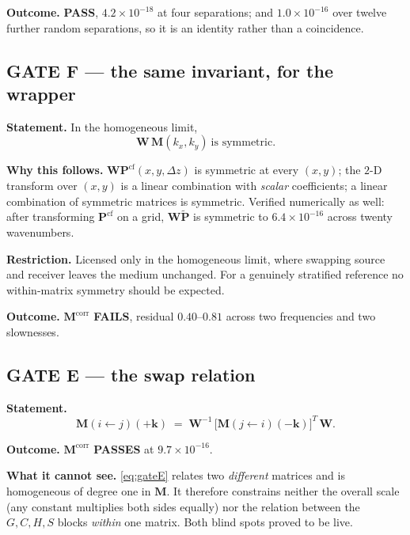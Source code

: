 \documentclass[11pt,a4paper]{article}
\newcommand{\bW}{\mathbf{W}}
\newcommand{\bM}{\mathbf{M}}
\newcommand{\bP}{\mathbf{P}}
\begin{document}
\textbf{Outcome.}  \textbf{PASS}, $4.2\times10^{-18}$ at four separations;
and $1.0\times10^{-16}$ over twelve further random separations, so it is an
identity rather than a coincidence.

\subsection{GATE F --- the same invariant, for the wrapper}

\textbf{Statement.}  In the homogeneous limit,
\begin{equation}\label{eq:gateF}
  \bW\,\bM(k_x,k_y) \ \text{is symmetric.}
\end{equation}

\textbf{Why this follows.}  $\bW\bP^{\text{cf}}(x,y,\Delta z)$ is symmetric at
every $(x,y)$; the $2$-D transform over $(x,y)$ is a linear combination with
\emph{scalar} coefficients; a linear combination of symmetric matrices is
symmetric.  Verified numerically as well: after transforming
$\bP^{\text{cf}}$ on a grid, $\bW\tilde{\bP}$ is symmetric to
$6.4\times10^{-16}$ across twenty wavenumbers.

\textbf{Restriction.}  Licensed only in the homogeneous limit, where swapping
source and receiver leaves the medium unchanged.  For a genuinely stratified
reference no within-matrix symmetry should be expected.

\textbf{Outcome.}  $\bM^{\text{corr}}$ \textbf{FAILS}, residual $0.40$--$0.81$
across two frequencies and two slownesses.

\subsection{GATE E --- the swap relation}\label{sec:gateE}

\textbf{Statement.}
\begin{equation}\label{eq:gateE}
  \bM(i\!\leftarrow\! j)(+\mathbf{k})
  \;=\; \bW^{-1}\,\bigl[\bM(j\!\leftarrow\! i)(-\mathbf{k})\bigr]^{T}\,\bW .
\end{equation}

\textbf{Outcome.}  $\bM^{\text{corr}}$ \textbf{PASSES} at
$9.7\times10^{-16}$.

\textbf{What it cannot see.}  \eqref{eq:gateE} relates two \emph{different}
matrices and is homogeneous of degree one in $\bM$.  It therefore constrains
neither the overall scale (any constant multiplies both sides equally) nor the
relation between the $G,C,H,S$ blocks \emph{within} one matrix.  Both blind
spots proved to be live.
\end{document}
